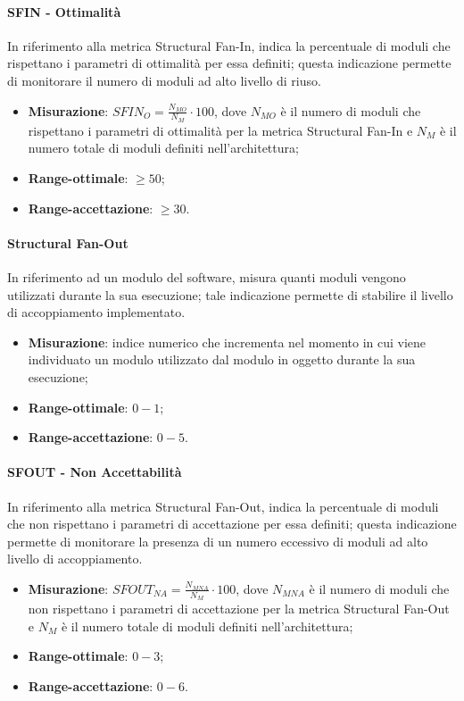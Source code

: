 \paragraph{SFIN - Ottimalità}
\label{sfin-ottimalita}
In riferimento alla metrica Structural Fan-In, indica la percentuale di moduli che rispettano i parametri di ottimalità per essa definiti; questa indicazione permette di monitorare il numero di moduli ad alto livello di riuso.
\begin{itemize}
\item \textbf{Misurazione}: $SFIN_{O}=\frac{N_{MO}}{N_{M}} \cdot 100$, dove $N_{MO}$ è il numero di moduli che rispettano i parametri di ottimalità per la metrica Structural Fan-In e $N_{M}$ è il numero totale di moduli definiti nell'architettura;
\item \textbf{Range-ottimale}: $\geq 50$;
\item \textbf{Range-accettazione}: $\geq 30$.
\end{itemize}
\paragraph{Structural Fan-Out}
\label{SFOUT}
In riferimento ad un modulo del software, misura quanti moduli vengono utilizzati durante la sua esecuzione; tale indicazione permette di stabilire il livello di accoppiamento implementato.
\begin{itemize}
\item \textbf{Misurazione}: indice numerico che incrementa nel momento in cui viene individuato un modulo utilizzato dal modulo in oggetto durante la sua esecuzione;
\item \textbf{Range-ottimale}: $0 - 1$;
\item \textbf{Range-accettazione}: $0 - 5$.
\end{itemize}
\paragraph{SFOUT - Non Accettabilità}
\label{sfout-NonAcc}
In riferimento alla metrica Structural Fan-Out, indica la percentuale di moduli che non rispettano i parametri di accettazione per essa definiti; questa indicazione permette di monitorare la presenza di un numero eccessivo di moduli ad alto livello di accoppiamento.
\begin{itemize}
\item \textbf{Misurazione}: $SFOUT_{NA}=\frac{N_{MNA}}{N_{M}} \cdot 100$, dove $N_{MNA}$ è il numero di moduli che non rispettano i parametri di accettazione per la metrica Structural Fan-Out e $N_{M}$ è il numero totale di moduli definiti nell'architettura;
\item \textbf{Range-ottimale}: $0 - 3$;
\item \textbf{Range-accettazione}: $0 - 6$.
\end{itemize}

